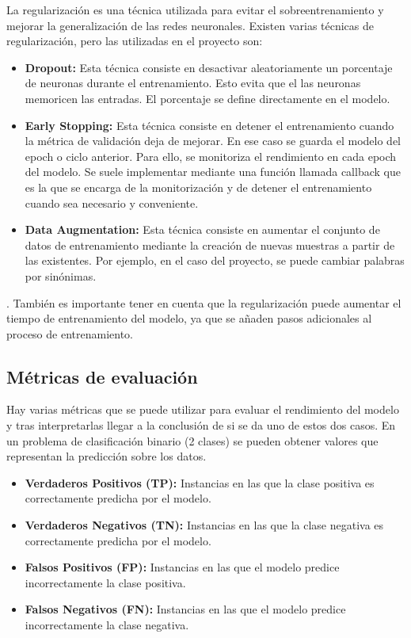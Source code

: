 La regularización es una técnica utilizada para evitar el sobreentrenamiento y mejorar la generalización de las redes neuronales.
Existen varias técnicas de regularización\cite{medium:regularizacion}, pero las utilizadas en el proyecto son:
\begin{itemize}
	\item \textbf{Dropout:} Esta técnica consiste en desactivar aleatoriamente un porcentaje de neuronas durante el entrenamiento. Esto evita que el las neuronas memoricen las entradas. El porcentaje se define directamente en el modelo.
	\item \textbf{Early Stopping:} Esta técnica consiste en detener el entrenamiento cuando la métrica de validación deja de mejorar. En ese caso se guarda el modelo del epoch o ciclo anterior. Para ello, se monitoriza el rendimiento en cada epoch del modelo. Se suele implementar mediante una función llamada callback que es la que se encarga de la monitorización y de detener el entrenamiento cuando sea necesario y conveniente.
	\item \textbf{Data Augmentation:} Esta técnica consiste en aumentar el conjunto de datos de entrenamiento mediante la creación de nuevas muestras a partir de las existentes. Por ejemplo, en el caso del proyecto, se puede cambiar palabras por sinónimas.
\end{itemize}
. 
También es importante tener en cuenta que la regularización puede aumentar el tiempo de entrenamiento del modelo, ya que se añaden pasos adicionales al proceso de entrenamiento.

\subsection{Métricas de evaluación}

Hay varias métricas\cite{clasificacion} que se puede utilizar para evaluar el rendimiento del modelo y tras interpretarlas llegar a la conclusión de si se da uno de estos dos casos.
En un problema de clasificación binario (2 clases) se pueden obtener valores que representan la predicción sobre los datos.

\begin{itemize}
	\item \textbf{Verdaderos Positivos (TP):} Instancias en las que la clase positiva es correctamente predicha por el modelo.
	\item \textbf{Verdaderos Negativos (TN):} Instancias en las que la clase negativa es correctamente predicha por el modelo.
	\item \textbf{Falsos Positivos (FP):} Instancias en las que el modelo predice incorrectamente la clase positiva.
	\item \textbf{Falsos Negativos (FN):} Instancias en las que el modelo predice incorrectamente la clase negativa.
\end{itemize}

